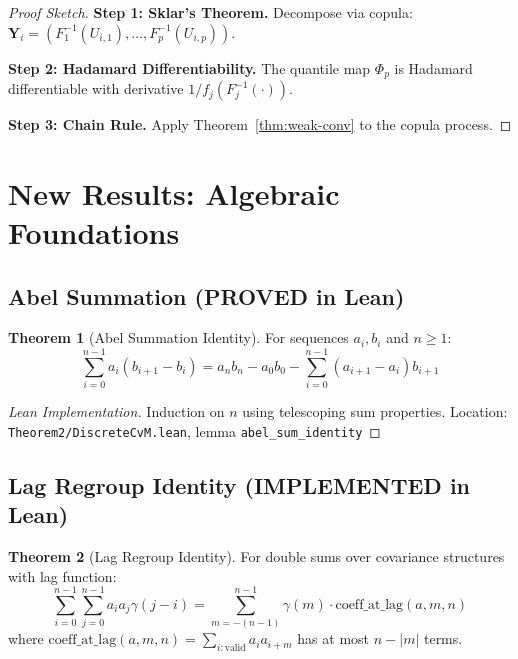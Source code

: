 \documentclass[final,3p,twocolumn,times,authoryear]{elsarticle}
\theoremstyle{definition}
\newtheorem{theorem}{Theorem}[section]
\begin{document}
\begin{proof}[Proof Sketch]
\textbf{Step 1: Sklar's Theorem.} Decompose via copula: $\mathbf{Y}_i = (F_1^{-1}(U_{i,1}), \dots, F_p^{-1}(U_{i,p}))$.

\textbf{Step 2: Hadamard Differentiability.} The quantile map $\Phi_p$ is Hadamard differentiable with derivative $1/f_j(F_j^{-1}(\cdot))$.

\textbf{Step 3: Chain Rule.} Apply Theorem~\ref{thm:weak-conv} to the copula process.
\end{proof}

\section{New Results: Algebraic Foundations}
\label{sec:new}

\subsection{Abel Summation (PROVED in Lean)}

\begin{theorem}[Abel Summation Identity]
For sequences $a_i, b_i$ and $n \geq 1$:
\begin{equation}
\sum_{i=0}^{n-1} a_i(b_{i+1} - b_i) = a_n b_n - a_0 b_0 - \sum_{i=0}^{n-1} (a_{i+1} - a_i) b_{i+1}
\end{equation}
\end{theorem}

\begin{proof}[Lean Implementation]
Induction on $n$ using telescoping sum properties. Location: \texttt{Theorem2/DiscreteCvM.lean}, lemma \texttt{abel\_sum\_identity}
\end{proof}

\subsection{Lag Regroup Identity (IMPLEMENTED in Lean)}

\begin{theorem}[Lag Regroup Identity]
\label{thm:lag-regroup}
For double sums over covariance structures with lag function:
\begin{equation}
\sum_{i=0}^{n-1} \sum_{j=0}^{n-1} a_i a_j \gamma(j-i) = \sum_{m=-(n-1)}^{n-1} \gamma(m) \cdot \text{coeff\_at\_lag}(a, m, n)
\end{equation}
where $\text{coeff\_at\_lag}(a, m, n) = \sum_{i: \text{valid}} a_i a_{i+m}$ has at most $n - |m|$ terms.
\end{theorem}
\end{document}
